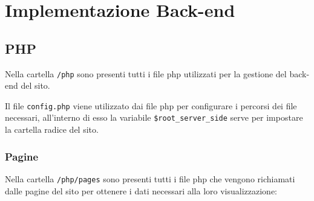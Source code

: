 \section{Implementazione Back-end}
\label{sec:back-end}

\subsection{PHP}
\label{subsec:php}
Nella cartella \texttt{/php} sono presenti tutti i file php utilizzati per la gestione del back-end del sito.

Il file \texttt{config.php} viene utilizzato dai file php per configurare i percorsi dei file necessari, all'interno di esso la variabile \texttt{\$root\_server\_side}
serve per impostare la cartella radice del sito.

\subsubsection{Pagine}
Nella cartella \texttt{/php/pages} sono presenti tutti i file php che vengono richiamati dalle pagine del sito per ottenere i dati necessari alla loro visualizzazione:
